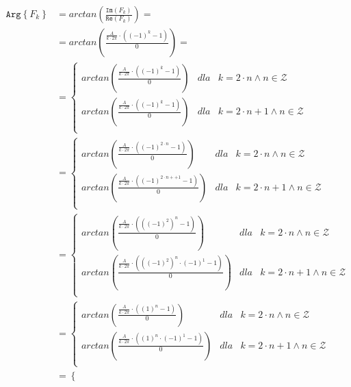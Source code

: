 \begin{task}
\begin{align*}
\mathtt{Arg}\left\{F_k\right\} &= arctan\left(\frac{\mathtt{Im}\left(F_k\right)}{\mathtt{Re}\left(F_k\right)}\right) =\\
&=arctan\left(\frac{\frac{A}{k\cdot 2 \pi}\cdot \left( (-1)^{k} -1 \right)}{0}\right) =\\
&=\left\{\begin{array}{lll}
arctan\left(\frac{\frac{A}{k\cdot 2 \pi}\cdot \left( (-1)^{k} -1 \right)}{0}\right) & dla &k = 2 \cdot n \wedge n \in \mathcal{Z}\\
arctan\left(\frac{\frac{A}{k\cdot 2 \pi}\cdot \left( (-1)^{k} -1 \right)}{0}\right) & dla & k = 2 \cdot n + 1 \wedge n \in \mathcal{Z}\\
\end{array}\right.\\
&=\left\{\begin{array}{lll}
arctan\left(\frac{\frac{A}{k\cdot 2 \pi}\cdot \left( (-1)^{2 \cdot n} -1 \right)}{0}\right) & dla &k = 2 \cdot n \wedge n \in \mathcal{Z}\\
arctan\left(\frac{\frac{A}{k\cdot 2 \pi}\cdot \left( (-1)^{2 \cdot n + +1} -1 \right)}{0}\right) & dla & k = 2 \cdot n + 1 \wedge n \in \mathcal{Z}\\
\end{array}\right.\\
&=\left\{\begin{array}{lll}
arctan\left(\frac{\frac{A}{k\cdot 2 \pi}\cdot \left( \left((-1)^{2}\right) ^n -1 \right)}{0}\right) & dla &k = 2 \cdot n \wedge n \in \mathcal{Z}\\
arctan\left(\frac{\frac{A}{k\cdot 2 \pi}\cdot \left( \left((-1)^{2}\right)^n \cdot \left(-1\right)^1 -1 \right)}{0}\right) & dla & k = 2 \cdot n + 1 \wedge n \in \mathcal{Z}\\
\end{array}\right.\\
&=\left\{\begin{array}{lll}
arctan\left(\frac{\frac{A}{k\cdot 2 \pi}\cdot \left( \left(1\right) ^n -1 \right)}{0}\right) & dla &k = 2 \cdot n \wedge n \in \mathcal{Z}\\
arctan\left(\frac{\frac{A}{k\cdot 2 \pi}\cdot \left( \left(1\right)^n \cdot \left(-1\right)^1 -1 \right)}{0}\right) & dla & k = 2 \cdot n + 1 \wedge n \in \mathcal{Z}\\
\end{array}\right.\\
&=\left\{\begin{array}{lll}

\end{array}
\end{align*}
\end{task}
